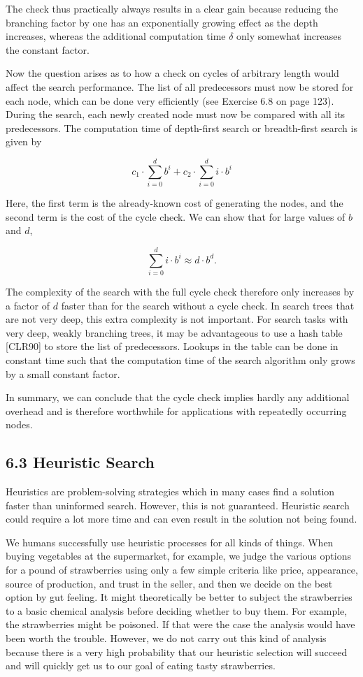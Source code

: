 \documentclass[10pt]{book}
\begin{document}
\begin{center}
The check thus practically always results in a clear gain because reducing the branching factor by one has an exponentially growing effect as the depth increases, whereas the additional computation time $\delta$ only somewhat increases the constant factor.

Now the question arises as to how a check on cycles of arbitrary length would affect the search performance. The list of all predecessors must now be stored for each node, which can be done very efficiently (see Exercise 6.8 on page 123). During the search, each newly created node must now be compared with all its predecessors. The computation time of depth-first search or breadth-first search is given by

$$
c_{1} \cdot \sum_{i=0}^{d} b^{i}+c_{2} \cdot \sum_{i=0}^{d} i \cdot b^{i}
$$

Here, the first term is the already-known cost of generating the nodes, and the second term is the cost of the cycle check. We can show that for large values of $b$ and $d$,

$$
\sum_{i=0}^{d} i \cdot b^{i} \approx d \cdot b^{d} .
$$

The complexity of the search with the full cycle check therefore only increases by a factor of $d$ faster than for the search without a cycle check. In search trees that are not very deep, this extra complexity is not important. For search tasks with very deep, weakly branching trees, it may be advantageous to use a hash table [CLR90] to store the list of predecessors. Lookups in the table can be done in constant time such that the computation time of the search algorithm only grows by a small constant factor.

In summary, we can conclude that the cycle check implies hardly any additional overhead and is therefore worthwhile for applications with repeatedly occurring nodes.

\subsection*{6.3 Heuristic Search}
Heuristics are problem-solving strategies which in many cases find a solution faster than uninformed search. However, this is not guaranteed. Heuristic search could require a lot more time and can even result in the solution not being found.

We humans successfully use heuristic processes for all kinds of things. When buying vegetables at the supermarket, for example, we judge the various options for a pound of strawberries using only a few simple criteria like price, appearance, source of production, and trust in the seller, and then we decide on the best option by gut feeling. It might theoretically be better to subject the strawberries to a basic chemical analysis before deciding whether to buy them. For example, the strawberries might be poisoned. If that were the case the analysis would have been worth the trouble. However, we do not carry out this kind of analysis because there is a very high probability that our heuristic selection will succeed and will quickly get us to our goal of eating tasty strawberries.



\end{center}
\end{document}
